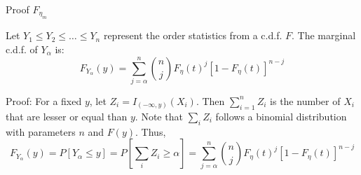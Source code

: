 \documentclass[xcolor=table]{beamer}
\begin{document}
\begin{frame}{Proof \(F_{\eta_m}\)}
    \begin{theorem}
    Let \(Y_1\leq Y_2 \leq \dots \leq Y_n\) represent the order statistics from a c.d.f. \(F\). The marginal c.d.f. of \(Y_\alpha\) is:
    \[
    F_{Y_\alpha}(y) =  \sum_{j = \alpha}^n \binom{n}{j} F_\eta(t)^j[1-F_\eta(t)]^{n-j}
    \]
    \end{theorem}
    Proof: For a fixed \(y\), let \(Z_i = I_{(-\infty,y)}(X_i)\). Then \(\sum_{i=1}^n Z_i\) is the number of \(X_i\) that are lesser or equal than \(y\). Note that \(\sum_i Z_i\) follows a binomial distribution with parameters \(n\) and \(F(y)\). Thus,
    \[
    F_{Y_\alpha}(y) = P[Y_\alpha \leq y] = P\left[\sum_i Z_i \geq \alpha\right] = \sum_{j = \alpha}^n \binom{n}{j} F_\eta(t)^j[1-F_\eta(t)]^{n-j}
    \]
\end{frame}
\end{document}
